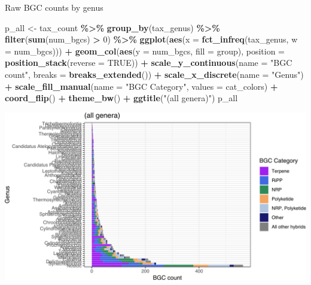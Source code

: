 \documentclass[
]{article}
\newenvironment{Shaded}{\begin{snugshade}}{\end{snugshade}}
\newcommand{\AttributeTok}[1]{\textcolor[rgb]{0.13,0.29,0.53}{#1}}
\newcommand{\ConstantTok}[1]{\textcolor[rgb]{0.56,0.35,0.01}{#1}}
\newcommand{\DecValTok}[1]{\textcolor[rgb]{0.00,0.00,0.81}{#1}}
\newcommand{\FunctionTok}[1]{\textcolor[rgb]{0.13,0.29,0.53}{\textbf{#1}}}
\newcommand{\NormalTok}[1]{#1}
\newcommand{\OtherTok}[1]{\textcolor[rgb]{0.56,0.35,0.01}{#1}}
\newcommand{\SpecialCharTok}[1]{\textcolor[rgb]{0.81,0.36,0.00}{\textbf{#1}}}
\newcommand{\StringTok}[1]{\textcolor[rgb]{0.31,0.60,0.02}{#1}}
\begin{document}
Raw BGC counts by genus

\begin{Shaded}
\begin{Highlighting}[]
\NormalTok{p\_all }\OtherTok{\textless{}{-}}\NormalTok{ tax\_count }\SpecialCharTok{\%\textgreater{}\%}
  \FunctionTok{group\_by}\NormalTok{(tax\_genus) }\SpecialCharTok{\%\textgreater{}\%}
  \FunctionTok{filter}\NormalTok{(}\FunctionTok{sum}\NormalTok{(num\_bgcs) }\SpecialCharTok{\textgreater{}} \DecValTok{0}\NormalTok{) }\SpecialCharTok{\%\textgreater{}\%}
  \FunctionTok{ggplot}\NormalTok{(}\FunctionTok{aes}\NormalTok{(}\AttributeTok{x =} \FunctionTok{fct\_infreq}\NormalTok{(tax\_genus, }\AttributeTok{w =}\NormalTok{ num\_bgcs))) }\SpecialCharTok{+}
  \FunctionTok{geom\_col}\NormalTok{(}\FunctionTok{aes}\NormalTok{(}\AttributeTok{y =}\NormalTok{ num\_bgcs, }\AttributeTok{fill =}\NormalTok{ group), }\AttributeTok{position =} \FunctionTok{position\_stack}\NormalTok{(}\AttributeTok{reverse =} \ConstantTok{TRUE}\NormalTok{)) }\SpecialCharTok{+}
  \FunctionTok{scale\_y\_continuous}\NormalTok{(}\AttributeTok{name =} \StringTok{"BGC count"}\NormalTok{, }\AttributeTok{breaks =} \FunctionTok{breaks\_extended}\NormalTok{()) }\SpecialCharTok{+}
  \FunctionTok{scale\_x\_discrete}\NormalTok{(}\AttributeTok{name =} \StringTok{"Genus"}\NormalTok{) }\SpecialCharTok{+}
  \FunctionTok{scale\_fill\_manual}\NormalTok{(}\AttributeTok{name =} \StringTok{"BGC Category"}\NormalTok{, }\AttributeTok{values =}\NormalTok{ cat\_colors) }\SpecialCharTok{+}
  \FunctionTok{coord\_flip}\NormalTok{() }\SpecialCharTok{+}
  \FunctionTok{theme\_bw}\NormalTok{() }\SpecialCharTok{+}
  \FunctionTok{ggtitle}\NormalTok{(}\StringTok{"(all genera)"}\NormalTok{)}
\NormalTok{p\_all}
\end{Highlighting}
\end{Shaded}

\includegraphics{analysis_files/figure-latex/unnamed-chunk-13-1.pdf}
\end{document}
